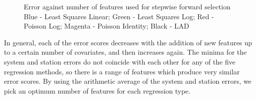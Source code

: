 \documentclass[11pt]{article}
\begin{document}
\begin{figure}
\centering
{}
\captionsetup{singlelinecheck=off, font=scriptsize, justification=centering}
\caption[]{
Error against number of features used for stepwise forward selection\linebreak
Blue - Least Squares Linear; Green - Least Squares Log; Red - Poisson Log; Magenta - Poisson Identity; Black - LAD
}
\label{fig:bfscores}
\end{figure}

In general, each of the error scores decreases with the addition of new features up to a certain number of covariates, and then increases again. The minima for the system and station errors do not coincide with each other for any of the five regression methods, so there is a range of features which produce very similar error scores. By using the arithmetic average of the system and station errors, we pick an optimum number of features for each regression type. %
\end{document}
